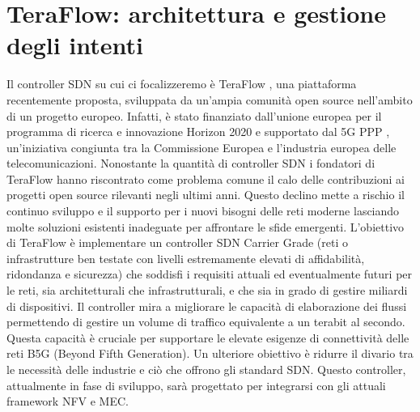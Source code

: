 \chapter{TeraFlow: architettura e gestione degli intenti}
\label{cap:teraflow}

Il controller SDN su cui ci focalizzeremo è TeraFlow \cite{TeraFlow}, una piattaforma recentemente proposta, sviluppata da un'ampia comunità open source nell'ambito di un progetto europeo. 
\newline Infatti, è stato finanziato dall'unione europea per il programma di ricerca e innovazione Horizon 2020 \cite{Horizon} e supportato dal 5G PPP \cite{5GPPP}, un'iniziativa congiunta tra la Commissione Europea e l'industria europea delle telecomunicazioni.
\newline Nonostante la quantità di controller SDN i fondatori di TeraFlow hanno riscontrato come problema comune il calo delle contribuzioni ai progetti open source rilevanti negli ultimi anni.
Questo declino mette a rischio il continuo sviluppo e il supporto per i nuovi bisogni delle reti moderne lasciando molte soluzioni esistenti inadeguate per affrontare le sfide emergenti.
\newline L'obiettivo di TeraFlow è implementare un controller SDN Carrier Grade (reti o infrastrutture ben testate con livelli estremamente elevati di affidabilità, ridondanza e sicurezza)
che soddisfi i requisiti attuali ed eventualmente futuri per le reti, sia architetturali che infrastrutturali, e che sia in grado di gestire miliardi di dispositivi.
Il controller mira a migliorare le capacità di elaborazione dei flussi permettendo di gestire un volume di traffico equivalente a un terabit al secondo. 
Questa capacità è cruciale per supportare le elevate esigenze di connettività delle reti B5G (Beyond Fifth Generation).
\newline Un ulteriore obiettivo è ridurre il divario tra le necessità delle industrie e ciò che offrono gli standard SDN.
\newline Questo controller, attualmente in fase di sviluppo, sarà progettato per integrarsi con gli attuali framework NFV e MEC.
